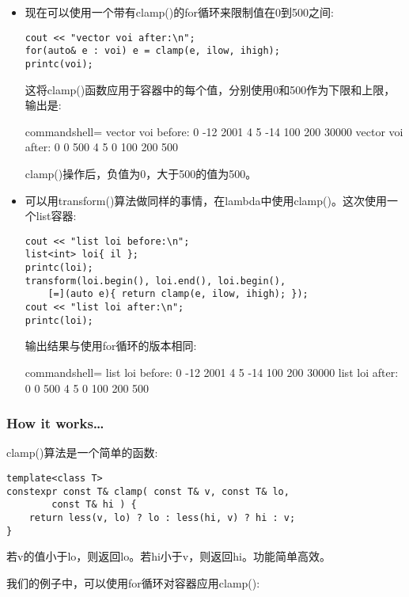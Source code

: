 \begin{itemize}
\item 
现在可以使用一个带有clamp()的for循环来限制值在0到500之间:

\begin{lstlisting}[style=styleCXX]
cout << "vector voi after:\n";
for(auto& e : voi) e = clamp(e, ilow, ihigh);
printc(voi);
\end{lstlisting}

这将clamp()函数应用于容器中的每个值，分别使用0和500作为下限和上限，输出是:

\begin{tcblisting}{commandshell={}}
vector voi before:
0 -12 2001 4 5 -14 100 200 30000
vector voi after:
0 0 500 4 5 0 100 200 500
\end{tcblisting}

clamp()操作后，负值为0，大于500的值为500。

\item 
可以用transform()算法做同样的事情，在lambda中使用clamp()。这次使用一个list容器:

\begin{lstlisting}[style=styleCXX]
cout << "list loi before:\n";
list<int> loi{ il };
printc(loi);
transform(loi.begin(), loi.end(), loi.begin(),
	[=](auto e){ return clamp(e, ilow, ihigh); });
cout << "list loi after:\n";
printc(loi);
\end{lstlisting}

输出结果与使用for循环的版本相同:

\begin{tcblisting}{commandshell={}}
list loi before:
0 -12 2001 4 5 -14 100 200 30000
list loi after:
0 0 500 4 5 0 100 200 500
\end{tcblisting}
\end{itemize}

\subsubsection{How it works…}

clamp()算法是一个简单的函数:

\begin{lstlisting}[style=styleCXX]
template<class T>
constexpr const T& clamp( const T& v, const T& lo,
		const T& hi ) {
	return less(v, lo) ? lo : less(hi, v) ? hi : v;
}
\end{lstlisting}

若v的值小于lo，则返回lo。若hi小于v，则返回hi。功能简单高效。

我们的例子中，可以使用for循环对容器应用clamp():

